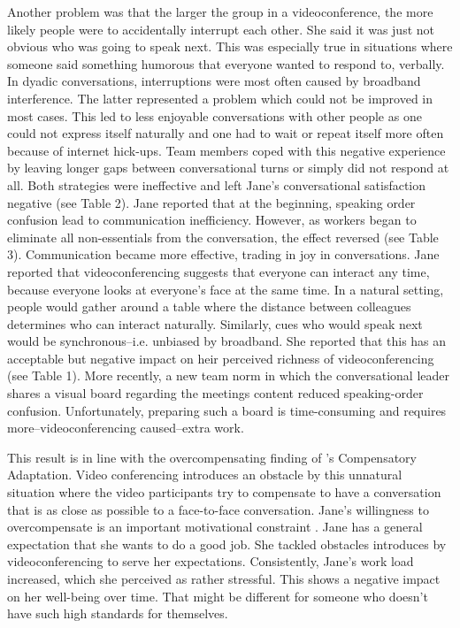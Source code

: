 \documentclass[man]{apa7}
\begin{document}
Another problem was that the larger the group in a videoconference, the more likely people were to accidentally interrupt each other. She said it was just not obvious who was going to speak next. This was especially true in situations where someone said something humorous that everyone wanted to respond to, verbally. In dyadic conversations, interruptions were most often caused by broadband interference. The latter represented a problem which could not be improved in most cases. This led to less enjoyable conversations with other people as one could not express itself naturally and one had to wait or repeat itself more often because of internet hick-ups. Team members coped with this negative experience by leaving longer gaps between conversational turns or simply did not respond at all. Both strategies were ineffective and left Jane's conversational satisfaction negative (see Table 2). Jane reported that at the beginning, speaking order confusion lead to communication inefficiency. However, as workers began to eliminate all non-essentials from the conversation, the effect reversed (see Table 3). Communication became more effective, trading in joy in conversations. Jane reported that videoconferencing suggests that everyone can interact any time, because everyone looks at everyone's face at the same time. In a natural setting, people would gather around a table where the distance between colleagues determines who can interact naturally. Similarly, cues who would speak next would be synchronous–i.e. unbiased by broadband. She reported that this has an acceptable but negative impact on heir perceived richness of videoconferencing (see Table 1). More recently, a new team norm in which the conversational leader shares a visual board regarding the meetings content reduced speaking-order confusion. Unfortunately, preparing such a board is time-consuming and requires more–videoconferencing caused–extra work.

This result is in line with the overcompensating finding of \citeauthor{Kock2005}'s Compensatory Adaptation. Video conferencing introduces an obstacle by this unnatural situation where the video participants try to compensate to have a conversation that is as close as possible to a face-to-face conversation. Jane's willingness to overcompensate is an important motivational constraint \parencite{Kock2001}. Jane has a general expectation that she wants to do a good job. She tackled obstacles introduces by videoconferencing to serve her expectations. Consistently, Jane's work load increased, which she perceived as rather stressful. This shows a negative impact on her well-being over time. That might be different for someone who doesn't have such high standards for themselves.
\end{document}
